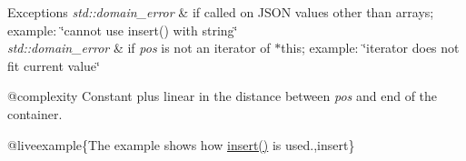 \begin{DoxyExceptions}{Exceptions}
{\em std\+::domain\+\_\+error} & if called on J\+S\+ON values other than arrays; example\+: {\ttfamily \char`\"{}cannot use insert() with string\char`\"{}} \\
\hline
{\em std\+::domain\+\_\+error} & if {\itshape pos} is not an iterator of $\ast$this; example\+: {\ttfamily \char`\"{}iterator does not fit current value\char`\"{}}\\
\hline
\end{DoxyExceptions}
@complexity Constant plus linear in the distance between {\itshape pos} and end of the container.

@liveexample\{The example shows how {\ttfamily \mbox{\hyperlink{classnlohmann_1_1basic__json_a0136728f5db69d4051c77b94307abd6c}{insert()}}} is used.,insert\}

